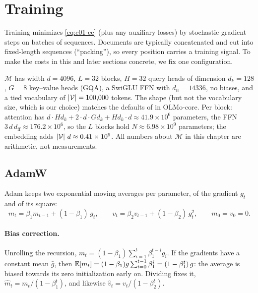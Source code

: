 \section{Training}\label{sec:c01-training}

Training minimizes \eqref{eq:c01-ce} (plus any auxiliary losses) by stochastic gradient
steps on batches of sequences. Documents are typically concatenated and cut into fixed-length
sequences (``packing''), so every position carries a training signal. To make the costs in
this and later sections concrete, we fix one configuration.

\begin{definition}\label{def:c01-model-m}
$\mathcal{M}$ has width $d = 4096$, $L = 32$ blocks, $H = 32$ query heads of dimension
$d_k = 128$, $G = 8$ key--value heads (GQA), a SwiGLU FFN with $d_{\mathrm{ff}} = 14336$,
no biases, and a tied vocabulary of $\left\lvert \mathcal{V}\right\rvert = 100{,}000$ tokens. The shape (but
not the vocabulary size, which is our choice) matches the defaults of
 in OLMo-core. Per block: attention has
$d\cdot Hd_k + 2\cdot d\cdot Gd_k + Hd_k\cdot d \approx 41.9\times 10^6$ parameters, the FFN
$3\,d\,d_{\mathrm{ff}} \approx 176.2\times 10^6$, so the $L$ blocks hold
$N \approx 6.98\times 10^9$ parameters; the embedding adds
$\left\lvert \mathcal{V}\right\rvert\,d \approx 0.41\times 10^9$. All numbers about $\mathcal{M}$ in this
chapter are arithmetic, not measurements.
\end{definition}

\subsection{AdamW}\label{sec:c01-adamw}

Adam \citep{c01-kingma2015adam} keeps two exponential moving averages per parameter, of the
gradient $g_t$ and of its square:
\begin{equation}\label{eq:c01-adam-moments}
  m_t = \beta_1 m_{t-1} + (1-\beta_1)\,g_t,\qquad
  v_t = \beta_2 v_{t-1} + (1-\beta_2)\,g_t^2,\qquad m_0 = v_0 = 0 .
\end{equation}
\paragraph{Bias correction.} Unrolling the recursion,
$m_t = (1-\beta_1)\sum_{i=1}^{t}\beta_1^{t-i}g_i$. If the gradients have a constant mean
$\bar{g}$, then $\mathbb{E}[m_t] = (1-\beta_1)\bar{g}\sum_{i=0}^{t-1}\beta_1^{i} = (1-\beta_1^t)\,\bar{g}$:
the average is biased towards its zero initialization early on. Dividing fixes it,
$\hat{m}_t = m_t/(1-\beta_1^t)$, and likewise $\hat{v}_t = v_t/(1-\beta_2^t)$.

